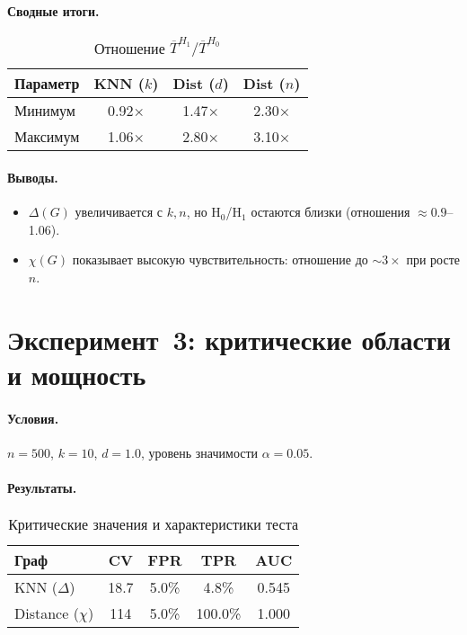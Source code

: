 \documentclass[12pt,a4paper]{article}
\begin{document}
\paragraph{Сводные итоги.}
\begin{table}[ht]
\centering
\caption{Отношение $\overline{T}^{H_1}/\overline{T}^{H_0}$}
\begin{tabular}{lccc}
\toprule
Параметр & KNN ($k$) & Dist ($d$) & Dist ($n$) \\
\midrule
Минимум & 0.92× & 1.47× & 2.30× \\
Максимум & 1.06× & 2.80× & 3.10× \\
\bottomrule
\end{tabular}
\end{table}

\paragraph{Выводы.}
\begin{itemize}
  \item $\Delta(G)$ увеличивается с $k,n$, но H$_0$/H$_1$ остаются близки (отношения $\approx 0.9$–1.06).
  \item $\chi(G)$ показывает высокую чувствительность: отношение до $\sim3\times$ при росте $n$.
\end{itemize}

\section{Эксперимент 3: критические области и мощность}
\paragraph{Условия.} $n=500$, $k=10$, $d=1.0$, уровень значимости $\alpha=0.05$.

\paragraph{Результаты.}
\begin{table}[ht]
\centering
\caption{Критические значения и характеристики теста}
\begin{tabular}{lcccc}
\toprule
Граф & CV & FPR & TPR & AUC \\
\midrule
KNN ($\Delta$)    & 18.7  & 5.0\%  & 4.8\%   & 0.545 \\
Distance ($\chi$) & 114   & 5.0\%  & 100.0\% & 1.000 \\
\bottomrule
\end{tabular}
\end{table}
\end{document}
